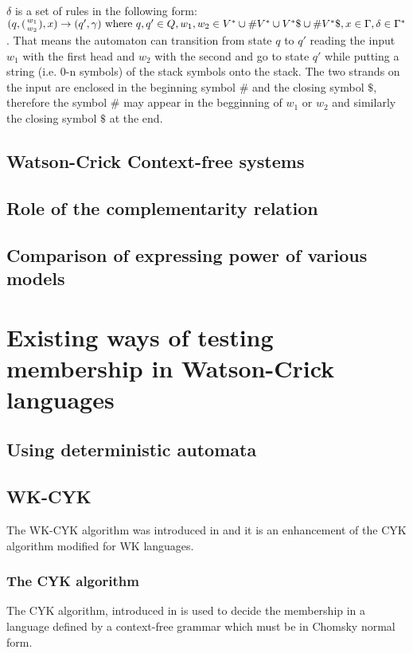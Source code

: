 $\delta$ is a set of rules in the following form: $(q, ({w_1 \atop w_2}), x) \rightarrow (q', \gamma) \textnormal{ where } q, q' \in Q, w_1, w_2 \in V^* \cup \#V^* \cup V^*\$ \cup \#V^*\$, x \in \Gamma, \delta \in \Gamma^*$. That means the automaton can transition from state $q$ to $q'$ reading the input $w_1$ with the first head and $w_2$ with the second and go to state $q'$ while putting a string (i.e. 0-n symbols) of the stack symbols onto the stack. The two strands on the input are enclosed in the beginning symbol $\#$ and the closing symbol $\$$, therefore the symbol $\#$ may appear in the begginning of $w_1$ or $w_2$ and similarly the closing symbol $\$$ at the end.




\section{Watson-Crick Context-free systems}

\section{Role of the complementarity relation}

\section{Comparison of expressing power of various models}

\chapter{Existing ways of testing membership in Watson-Crick languages}

\section{Using deterministic automata}

\section{WK-CYK}
The WK-CYK algorithm was introduced in \cite{WK_CYK} and it is an enhancement of the CYK algorithm modified for WK languages.
\subsection{The CYK algorithm}
The CYK algorithm, introduced in  is used to decide the membership in a language defined by a context-free grammar which must be in Chomsky normal form.

